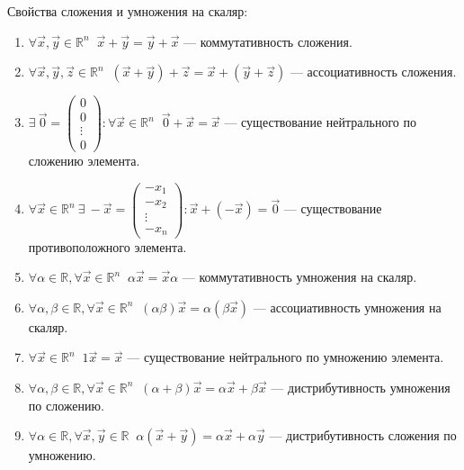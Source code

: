 \documentclass[a4paper, 12pt]{article}
\begin{document}
Свойства сложения и умножения на скаляр:
\begin{enumerate}
\item $\forall \vec{x}, \vec{y} \in \mathbb{R}^n\;\; \vec{x} + \vec{y} = \vec{y} + \vec{x}$ --- коммутативность сложения.

\item $\forall\vec{x}, \vec{y}, \vec{z} \in \mathbb{R}^n\;\; (\vec{x} + \vec{y}) + \vec{z} = \vec{x} + (\vec{y} + \vec{z})$ --- ассоциативность сложения.

\item $\exists\ \vec{0} =
\begin{pmatrix}
0 \\ 0 \\ \vdots \\ 0
\end{pmatrix} : \forall\vec{x} \in \mathbb{R}^n\;\; \vec{0} + \vec{x} = \vec{x}$ --- существование нейтрального по сложению элемента.

\item $\forall\vec{x} \in \mathbb{R}^n\ \exists \ -\vec{x} =
\begin{pmatrix}
-x_1 \\ -x_2\\ \vdots\\ -x_n
\end{pmatrix} : \vec{x} + (-\vec{x}) = \vec{0}$ --- существование противоположного элемента.

\item $\forall \alpha \in \mathbb{R}, \forall \vec{x} \in \mathbb{R}^n\;\; \alpha\vec{x} = \vec{x}\alpha$ --- коммутативность умножения на скаляр.

\item $\forall \alpha, \beta \in \mathbb{R}, \forall \vec{x} \in \mathbb{R}^n\;\; (\alpha\beta)\vec{x} = \alpha(\beta\vec{x})$ --- ассоциативность умножения на скаляр.

\item $\forall \vec{x} \in \mathbb{R}^n\;\; 1\vec{x} = \vec{x}$ --- существование нейтрального по умножению элемента.

\item $\forall \alpha, \beta \in \mathbb{R}, \forall \vec{x} \in \mathbb{R}^n\;\; (\alpha + \beta)\vec{x} = \alpha\vec{x} + \beta\vec{x}$ --- дистрибутивность умножения по сложению.

\item $\forall \alpha \in \mathbb{R}, \forall \vec{x}, \vec{y} \in \mathbb{R}\;\; \alpha(\vec{x} + \vec{y}) = \alpha\vec{x} + \alpha\vec{y}$ --- дистрибутивность сложения по умножению.


\end{enumerate}
\end{document}
